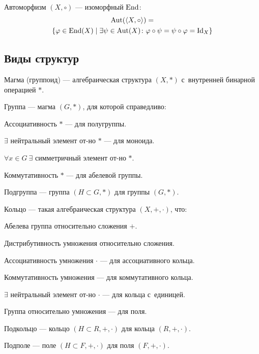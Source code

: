{\bold Автоморфизм} $(X,\circ)$ --- изоморфный $\operatorname{End}$:
$$\begin{gathered}
\operatorname{Aut}(\langle X,\circ\rangle)=\\
\{\varphi\in\operatorname{End}(X)\mid\exists\psi\in\operatorname{Aut}(X)\colon\varphi\circ\psi=\psi\circ\varphi=\mathrm{Id}_X\}
\end{gathered}$$

\subsection{Виды структур}

{\bold Магма} {\ital (группоид)} --- алгебраическая структура $(X,\ast)$ с~внутренней бинарной операцией $\ast$.

{\bold Группа} --- магма $(G,\ast)$, для которой справедливо:
\begin{list*}[][\#]
\item Ассоциативность $\ast$ --- для {\bold полугруппы}.
\item $\exists$ нейтральный элемент от-но $\ast$ --- для {\bold моноида}.
\item $\forall x\in G\ \exists$ симметричный элемент от-но $\ast$.
{\color{desc}\item Коммутативность $\ast$ --- для {\bold абелевой} группы.}
\end{list*}
{\bold Подгруппа} --- группа $(H\subset G,\ast)$ для группы $(G,\ast)$.

{\bold Кольцо} --- такая алгебраическая структура $(X,+,\cdot)$, что:
\begin{list*}[][\#]
\item Абелева группа относительно {\ital сложения} $+$.
\item Дистрибутивность {\ital умножения} относительно {\ital сложения}.
{\color{desc}\item Ассоциативность {\ital умножения} $\cdot$ --- для {\bold ассоциативного кольца}.}
{\color{desc}\item Коммутативность {\ital умножения} --- для {\bold коммутативного кольца}.}
{\color{desc}\item $\exists$ нейтральный элемент от-но $\cdot$ --- для {\bold кольца с~единицей}.}
{\color{desc}\item Группа относительно {\ital умножения} --- для {\bold поля}.}
\end{list*}

{\bold Подкольцо} --- кольцо $(H\subset R,+,\cdot)$ для кольца $(R,+,\cdot)$.

{\bold Подполе} --- поле $(H\subset F,+,\cdot)$ для поля $(F,+,\cdot)$.

